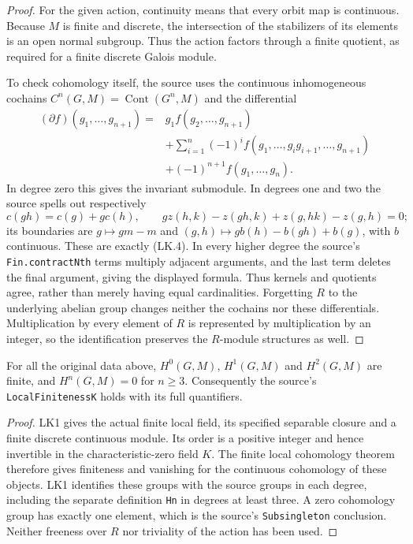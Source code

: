 \begin{proof}
For the given action, continuity means that every orbit map is
continuous.  Because $M$ is finite and discrete, the intersection of
the stabilizers of its elements is an open normal subgroup.  Thus the
action factors through a finite quotient, as required for a finite
discrete Galois module.

To check cohomology itself, the source uses the continuous
inhomogeneous cochains $C^n(G,M)=\operatorname{Cont}(G^n,M)$ and
the differential
\[
\begin{split}
 (\partial f)(g_1,\ldots,g_{n+1})={}&
 g_1f(g_2,\ldots,g_{n+1})\\
 &+\sum_{i=1}^{n}(-1)^i
 f(g_1,\ldots,g_i g_{i+1},\ldots,g_{n+1})\\
 &+(-1)^{n+1}f(g_1,\ldots,g_n).
\end{split}
\tag{LK.4}
\]
In degree zero this gives the invariant submodule.  In degrees one
and two the source spells out respectively
\[
 c(gh)=c(g)+g c(h),\qquad
 g z(h,k)-z(gh,k)+z(g,hk)-z(g,h)=0;
 \tag{LK.5}
\]
its boundaries are $g\mapsto gm-m$ and
$(g,h)\mapsto g b(h)-b(gh)+b(g)$, with $b$ continuous.
These are exactly (LK.4).  In every higher degree the source's
\texttt{Fin.contractNth} terms multiply adjacent arguments, and the
last term deletes the final argument, giving the displayed formula.
Thus kernels and quotients agree, rather than merely having equal
cardinalities.  Forgetting $R$ to the underlying abelian group changes
neither the cochains nor these differentials.  Multiplication by
every element of $R$ is represented by multiplication by an integer,
so the identification preserves the $R$-module structures as well.
\end{proof}

\begin{proposition}
\label{prop:lk-finiteness}
For all the original data above, $H^0(G,M)$, $H^1(G,M)$ and
$H^2(G,M)$ are finite, and $H^n(G,M)=0$ for $n\ge3$.
Consequently the source's \texttt{LocalFinitenessK}
holds with its full quantifiers.
\end{proposition}

\begin{proof}
LK1 gives the actual finite local field, its specified separable
closure and a finite discrete continuous module.  Its order is a
positive integer and hence invertible in the characteristic-zero
field $K$.  The finite local cohomology theorem therefore gives
finiteness and vanishing for the continuous cohomology of these
objects.  LK1 identifies these groups with the source groups in each
degree, including the separate definition \texttt{Hn} in degrees
at least three.  A zero cohomology group has exactly one element,
which is the source's \texttt{Subsingleton} conclusion.  Neither
freeness over $R$ nor triviality of the action has been used.
\end{proof}

